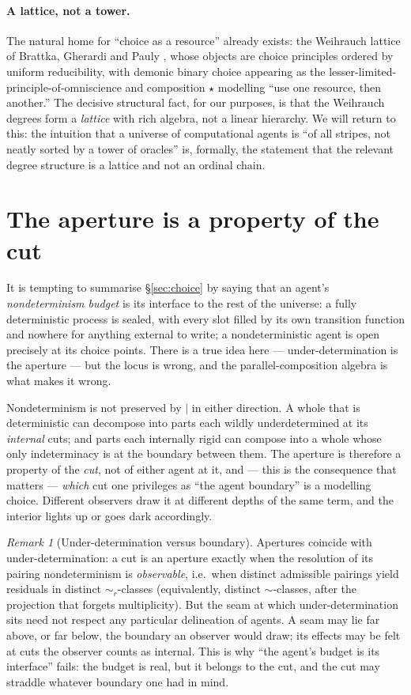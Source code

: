 \documentclass[11pt]{article}
\theoremstyle{definition}
\theoremstyle{plain}
\theoremstyle{remark}
\newtheorem{remark}{Remark}
\newcommand{\bisim}{\sim}
\newcommand{\rbisim}{\sim_{r}}
\newcommand{\Cut}{\mid}
\begin{document}
\paragraph{A lattice, not a tower.}
The natural home for ``choice as a resource'' already exists: the Weihrauch
lattice of Brattka, Gherardi and Pauly \cite{weihrauch}, whose objects are
choice principles ordered by uniform reducibility, with demonic binary choice
appearing as the lesser-limited-principle-of-omniscience and composition
$\star$ modelling ``use one resource, then another.'' The decisive structural
fact, for our purposes, is that the Weihrauch degrees form a \emph{lattice} with
rich algebra, not a linear hierarchy. We will return to this: the intuition that
a universe of computational agents is ``of all stripes, not neatly sorted by a
tower of oracles'' is, formally, the statement that the relevant degree structure
is a lattice and not an ordinal chain.

\section{The aperture is a property of the cut}\label{sec:aperture}

It is tempting to summarise \S\ref{sec:choice} by saying that an agent's
\emph{nondeterminism budget} is its interface to the rest of the universe: a
fully deterministic process is sealed, with every slot filled by its own
transition function and nowhere for anything external to write; a
nondeterministic agent is open precisely at its choice points. There is a true
idea here --- under-determination is the aperture --- but the locus is wrong, and
the parallel-composition algebra is what makes it wrong.

Nondeterminism is not preserved by $\Cut$ in either direction. A whole that is
deterministic can decompose into parts each wildly underdetermined at its
\emph{internal} cuts; and parts each internally rigid can compose into a whole
whose only indeterminacy is at the boundary between them. The aperture is
therefore a property of the \emph{cut}, not of either agent at it, and --- this is
the consequence that matters --- \emph{which} cut one privileges as ``the agent
boundary'' is a modelling choice. Different observers draw it at different depths
of the same term, and the interior lights up or goes dark accordingly.

\begin{remark}[Under-determination versus boundary]\label{rmk:seam}
Apertures coincide with under-determination: a cut is an aperture exactly when the
resolution of its pairing nondeterminism is \emph{observable}, i.e.\ when distinct
admissible pairings yield residuals in distinct $\rbisim$-classes (equivalently,
distinct $\bisim$-classes, after the projection that forgets multiplicity). But
the seam at which under-determination sits need not respect any particular
delineation of agents. A seam may lie far above, or far below, the boundary an
observer would draw; its effects may be felt at cuts the observer counts as
internal. This is why ``the agent's budget is its interface'' fails: the budget is
real, but it belongs to the cut, and the cut may straddle whatever boundary one
had in mind.
\end{remark}
\end{document}
